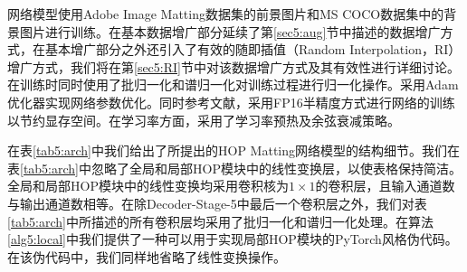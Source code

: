 网络模型使用Adobe Image Matting数据集\cite{xu2017deep}的前景图片和MS COCO数据集中的背景图片进行训练\cite{lin2014microsoft}。在基本数据增广部分延续了第\ref{sec5:aug}节中描述的数据增广方式，在基本增广部分之外还引入了有效的随即插值（Random Interpolation，RI）增广方式，我们将在第\ref{sec5:RI}节中对该数据增广方式及其有效性进行详细讨论。在训练时同时使用了批归一化\cite{ioffe2015batch}和谱归一化\cite{miyato2018spectral}对训练过程进行归一化操作。采用Adam优化器\cite{kingma2014adam}实现网络参数优化。同时参考文献\parencite{he2019bag}，采用FP16半精度方式进行网络的训练以节约显存空间。在学习率方面，采用了学习率预热\cite{goyal2017accurate}及余弦衰减\cite{loshchilov2016sgdr}策略。

在表\ref{tab5:arch}中我们给出了所提出的HOP Matting网络模型的结构细节。我们在表\ref{tab5:arch}中忽略了全局和局部HOP模块中的线性变换层，以使表格保持简洁。全局和局部HOP模块中的线性变换均采用卷积核为$1\times 1$的卷积层，且输入通道数与输出通道数相等。在除Decoder-Stage-5中最后一个卷积层之外，我们对表\ref{tab5:arch}中所描述的所有卷积层均采用了批归一化\cite{ioffe2015batch}和谱归一化\cite{miyato2018spectral}处理。在算法\ref{alg5:local}中我们提供了一种可以用于实现局部HOP模块的PyTorch\cite{paszke2017automatic}风格伪代码。在该伪代码中，我们同样地省略了线性变换操作。

